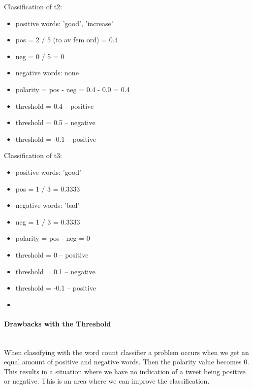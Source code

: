Classification of t2:
\begin{itemize}
	\item positive words: 'good', 'increase'
    \item pos = 2 / 5 (to av fem ord) = 0.4
    \item neg = 0 / 5 = 0
	\item negative words: none
    \item polarity = pos - neg = 0.4 - 0.0 = 0.4
    \item threshold = 0.4 -- positive
    \item threshold = 0.5 -- negative 
    \item threshold = -0.1 -- positive
\end{itemize}

Classification of t3:
\begin{itemize}
	\item positive words: 'good'
    \item pos = 1 / 3 = 0.3333
	\item negative words: 'bad'
    \item neg = 1 / 3 = 0.3333
    \item polarity = pos - neg = 0
    \item threshold = 0 -- positive
    \item threshold = 0.1 -- negative
    \item threshold = -0.1 -- positive
	\item 
\end{itemize}

\paragraph{Drawbacks with the Threshold}
\hspace{0pt}\\
When classifying with the word count classifier a problem occurs when we
get an equal amount of positive and negative words. Then the polarity value
becomes 0. This results in a situation where we have no indication of a tweet
being positive or negative. This is an area where we can improve the
classification. 

